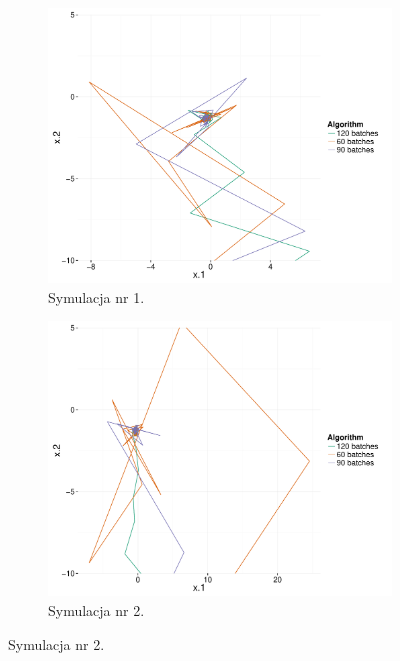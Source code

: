\begin{figure}[hbt!]
  \begin{center}
   \begin{subfigure}[h!]{0.45\textwidth}
      \includegraphics[width=\textwidth]{Obrazki/plot1_cox.pdf}
      \caption{Symulacja nr 1.}
   \end{subfigure}     
   \begin{subfigure}[h!]{0.45\textwidth}
      \includegraphics[width=\textwidth]{Obrazki/plot2_cox.pdf}
      \caption{Symulacja nr 2.}
   \end{subfigure}  

\end{center}
\end{figure}
